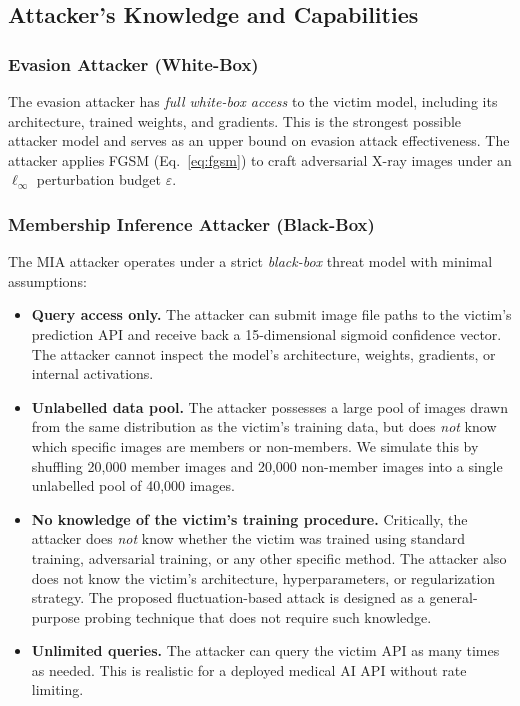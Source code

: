 \documentclass[conference]{IEEEtran}
\begin{document}
\subsection{Attacker's Knowledge and Capabilities}

\subsubsection{Evasion Attacker (White-Box)}
The evasion attacker has \textit{full white-box access} to the victim model, including its architecture, trained weights, and gradients. This is the strongest possible attacker model and serves as an upper bound on evasion attack effectiveness. The attacker applies FGSM (Eq.~\ref{eq:fgsm}) to craft adversarial X-ray images under an $\ell_\infty$ perturbation budget $\varepsilon$.

\subsubsection{Membership Inference Attacker (Black-Box)}
The MIA attacker operates under a strict \textit{black-box} threat model with minimal assumptions:
\begin{itemize}[leftmargin=*]
    \item \textbf{Query access only.} The attacker can submit image file paths to the victim's prediction API and receive back a 15-dimensional sigmoid confidence vector. The attacker cannot inspect the model's architecture, weights, gradients, or internal activations.
    
    \item \textbf{Unlabelled data pool.} The attacker possesses a large pool of images drawn from the same distribution as the victim's training data, but does \textit{not} know which specific images are members or non-members. We simulate this by shuffling 20,000 member images and 20,000 non-member images into a single unlabelled pool of 40,000 images.
    
    \item \textbf{No knowledge of the victim's training procedure.} Critically, the attacker does \textit{not} know whether the victim was trained using standard training, adversarial training, or any other specific method. The attacker also does not know the victim's architecture, hyperparameters, or regularization strategy. The proposed fluctuation-based attack is designed as a general-purpose probing technique that does not require such knowledge.
    
    \item \textbf{Unlimited queries.} The attacker can query the victim API as many times as needed. This is realistic for a deployed medical AI API without rate limiting.
\end{itemize}
\end{document}
